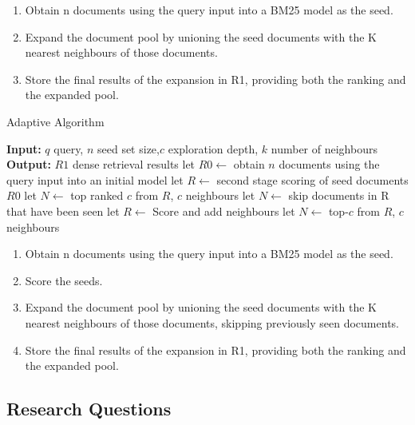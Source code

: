 \documentclass[sigconf,authorversion,nonacm]{acmart}
\begin{document}
\begin{enumerate}

	\item Obtain n documents using the query input into a BM25 model as the seed.
	\item Expand the document pool by unioning the seed documents with the K nearest neighbours of those documents.
	\item Store the final results of the expansion in R1, providing both the ranking and the expanded pool.

\end{enumerate}

\begin{algorithm}
	\caption{Adaptive Algorithm}
	\begin{algorithmic}[1]
		\STATE \textbf{Input:} \( q \) query, \( n \) seed set size,\( c \) exploration depth, \( k
		\) number of neighbours
		\STATE \textbf{Output:} \( R1 \) dense retrieval results
		\STATE let \( R0 \leftarrow \) obtain \( n \) documents using the query input into an initial model
		\STATE let \( R \leftarrow \) second stage scoring of seed documents \(R0\)
		\STATE let \( N \leftarrow\) top ranked \( c  \) from \(R \), \(c \) neighbours
		\STATE let \( N \leftarrow\) skip documents in R that have been seen
		\STATE let \( R \leftarrow \) Score and add neighbours
		\STATE let \( N \leftarrow\) top-\( c  \) from \(R \), \(c \) neighbours
		\ENDWHILE
	\end{algorithmic}
\end{algorithm}

\begin{enumerate}

	\item Obtain n documents using the query input into a BM25 model as the seed.

	\item Score the seeds.

	\item Expand the document pool by unioning the seed documents with the K nearest neighbours of
	      those documents, skipping previously seen documents.

	\item Store the final results of the expansion in R1, providing both the ranking and the
	      expanded pool.

\end{enumerate}

\subsection{Research Questions}
\end{document}
